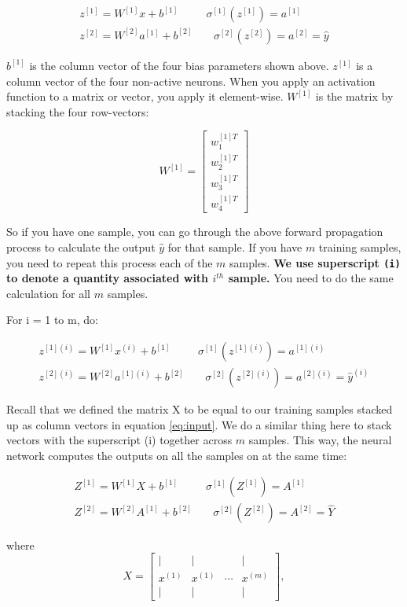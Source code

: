 \documentclass[12pt,]{krantz}
\begin{document}
\[\begin{array}{cc}
z^{[1]}=W^{[1]}x+b^{[1]} & \ \ \sigma^{[1]}(z^{[1]})=a^{[1]}\\
z^{[2]}=W^{[2]}a^{[1]}+b^{[2]} & \ \ \ \ \ \sigma^{[2]}(z^{[2]})=a^{[2]}=\hat{y}
\end{array}\]

\(b^{[1]}\) is the column vector of the four bias parameters shown above. \(z^{[1]}\) is a column vector of the four non-active neurons. When you apply an activation function to a matrix or vector, you apply it element-wise. \(W^{[1]}\) is the matrix by stacking the four row-vectors:

\[W^{[1]}=\left[\begin{array}{c}
w_{1}^{[1]T}\\
w_{2}^{[1]T}\\
w_{3}^{[1]T}\\
w_{4}^{[1]T}
\end{array}\right]\]

So if you have one sample, you can go through the above forward propagation process to calculate the output \(\hat{y}\) for that sample. If you have \(m\) training samples, you need to repeat this process each of the \(m\) samples. \textbf{We use superscript \texttt{(i)} to denote a quantity associated with \(i^{th}\) sample.} You need to do the same calculation for all \(m\) samples.

For i = 1 to m, do:

\[\begin{array}{cc}
z^{[1](i)}=W^{[1]}x^{(i)}+b^{[1]} & \ \ \sigma^{[1]}(z^{[1](i)})=a^{[1](i)}\\
z^{[2](i)}=W^{[2]}a^{[1](i)}+b^{[2]} & \ \ \ \ \ \sigma^{[2]}(z^{[2](i)})=a^{[2](i)}=\hat{y}^{(i)}
\end{array}\]

Recall that we defined the matrix X to be equal to our training samples stacked up as column vectors in equation \eqref{eq:input}. We do a similar thing here to stack vectors with the superscript (i) together across \(m\) samples. This way, the neural network computes the outputs on all the samples on at the same time:

\[\begin{array}{cc}
Z^{[1]}=W^{[1]}X+b^{[1]} & \ \ \sigma^{[1]}(Z^{[1]})=A^{[1]}\\
Z^{[2]}=W^{[2]}A^{[1]}+b^{[2]} & \ \ \ \ \ \sigma^{[2]}(Z^{[2]})=A^{[2]}=\hat{Y}
\end{array}\]

where
\[X=\left[\begin{array}{cccc}
| & | &  & |\\
x^{(1)} & x^{(1)} & \cdots & x^{(m)}\\
| & | &  & |
\end{array}\right],\]
\end{document}
